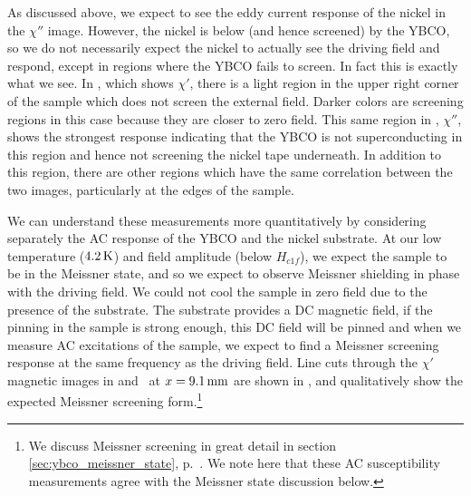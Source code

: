 As discussed above, we expect to see the eddy current response of the nickel
in the $\chi''$ image. However, the nickel is below (and hence
screened) by the YBCO, so we do not necessarily expect the 
nickel to actually see the driving field and respond,
except in regions where the YBCO fails to screen. 
In fact this is exactly what we see. 
In , which shows
$\chi'$,
there is a light 
region in the upper right corner of the sample which does
not screen the external field. Darker colors are screening
regions in this case because they are closer to zero field.
This same region in 
, $\chi''$, 
shows the strongest response 
indicating that the YBCO is not superconducting in 
this region and hence not screening the nickel tape underneath. 
In addition to this region, there are other regions which have the 
same correlation between the two images, particularly at the edges of 
the sample.

We can understand these measurements more quantitatively by 
considering separately the AC response of the YBCO and the nickel
substrate. At our low temperature ($4.2\,\kelvin$) and field amplitude
(below $H_{c1f}$),
we expect the sample to be in the Meissner state, and so we expect to
observe Meissner shielding in phase with the driving field. 
We could not cool the sample in zero field due to the presence of the 
substrate. The substrate provides a DC magnetic field, if the pinning
in the sample is strong enough, this DC field will be pinned and
when we measure AC excitations of the sample, we expect to find
a Meissner screening response at the same frequency as the driving 
field.
Line cuts through the $\chi'$ magnetic images in 
 and 
\ at $x=9.1\,\mm$ are shown in 
, and qualitatively show the expected
Meissner screening form.\footnote{We discuss Meissner screening
in great detail in section \ref{sec:ybco_meissner_state}, 
p.~\pageref{sec:ybco_meissner_state}. We note here that these
AC susceptibility measurements agree with the Meissner state
discussion below.} 


